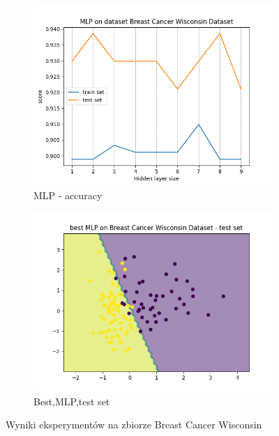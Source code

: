 \documentclass[12pt]{article}
\newcommand*{\subfigwidth}{0.24\textwidth}
\begin{document}
\begin{figure}[H]
\begin{subfigure}[t]{\subfigwidth}
        \includegraphics[width=\linewidth]{img/other_datasets/mlp/breast_accuracy.png}
        \caption{MLP - accuracy}
    \end{subfigure}
    \hfill
    \begin{subfigure}[t]{\subfigwidth}
        \includegraphics[width=\linewidth]{img/other_datasets/mlp/breast_best_boundary_test.png}
        \caption{Best,MLP,test set}
    \end{subfigure}
    \caption{Wyniki eksperymentów na zbiorze Breast Cancer Wisconsin}
\end{figure}
\end{document}
